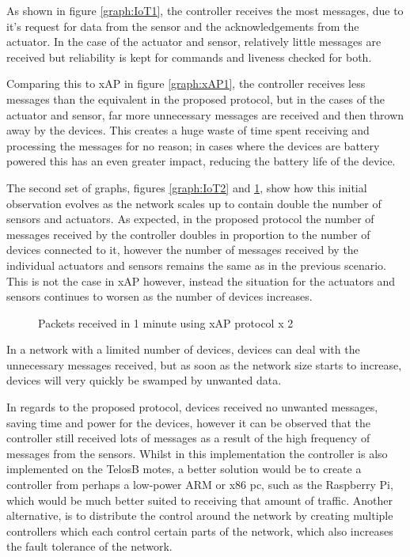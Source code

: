 As shown in figure \ref{graph:IoT1}, the controller receives the most messages, due to it's request for data from the sensor and the acknowledgements from the actuator. In the case of the actuator and sensor, relatively little messages are received but reliability is kept for commands and liveness checked for both. 

Comparing this to xAP in figure \ref{graph:xAP1}, the controller receives less messages than the equivalent in the proposed protocol, but in the cases of the actuator and sensor, far more unnecessary messages are received and then thrown away by the devices. This creates a huge waste of time spent receiving and processing the messages for no reason; in cases where the devices are battery powered this has an even greater impact, reducing the battery life of the device.

The second set of graphs, figures \ref{graph:IoT2} and \ref{graph:xAP2}, show how this initial observation evolves as the network scales up to contain double the number of sensors and actuators. As expected, in the proposed protocol the number of messages received by the controller doubles in proportion to the number of devices connected to it, however the number of messages received by the individual actuators and sensors remains the same as in the previous scenario. This is not the case in xAP however, instead the situation for the actuators and sensors continues to worsen as the number of devices increases.
\begin{figure}[h]
\begin{center}
\begin{minipage}{.5\textwidth}

\caption{Packets received in 1 minute using IoT protocol x 2}
\label{graph:IoT2}
\end{minipage}%
\begin{minipage}{.5\textwidth}

\caption{Packets received in 1 minute using xAP protocol x 2}
\label{graph:xAP2}
\end{minipage}
\end{center}
\end{figure}

In a network with a limited number of devices, devices can deal with the unnecessary messages received, but as soon as the network size starts to increase, devices will very quickly be swamped by unwanted data.

In regards to the proposed protocol, devices received no unwanted messages, saving time and power for the devices, however it can be observed that the controller still received lots of messages as a result of the high frequency of messages from the sensors. Whilst in this implementation the controller is also implemented on the TelosB motes, a better solution would be to create a controller from perhaps a low-power ARM or x86 pc, such as the Raspberry Pi, which would be much better suited to receiving that amount of traffic. Another alternative, is to distribute the control around the network by creating multiple controllers which each control certain parts of the network, which also increases the fault tolerance of the network.


